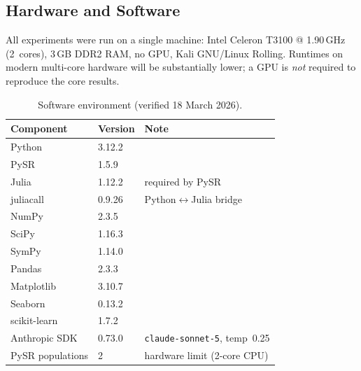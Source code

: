 \documentclass[twoside,11pt]{article}
\begin{document}
\subsection{Hardware and Software}

All experiments were run on a single machine: Intel Celeron T3100 @
1.90\,GHz (2~cores), 3\,GB DDR2 RAM, no GPU, Kali GNU/Linux Rolling.
Runtimes on modern multi-core hardware will be substantially lower; a GPU
is \emph{not} required to reproduce the core results.

\begin{table}[H]
\centering
\caption{Software environment (verified 18 March 2026).}
\label{tab:runtime_reproducibility}
\small
\begin{tabular}{@{}lll@{}}
\toprule
\textbf{Component} & \textbf{Version} & \textbf{Note} \\
\midrule
Python       & 3.12.2  & \\
PySR         & 1.5.9   & \\
Julia        & 1.12.2  & required by PySR \\
juliacall    & 0.9.26  & Python$\leftrightarrow$Julia bridge \\
NumPy        & 2.3.5   & \\
SciPy        & 1.16.3  & \\
SymPy        & 1.14.0  & \\
Pandas       & 2.3.3   & \\
Matplotlib   & 3.10.7  & \\
Seaborn      & 0.13.2  & \\
scikit-learn & 1.7.2   & \\
Anthropic SDK & 0.73.0 & \texttt{claude-sonnet-5}, temp~0.25 \\
\midrule
PySR populations & 2 & hardware limit (2-core CPU) \\
\bottomrule
\end{tabular}
\end{table}
\end{document}
